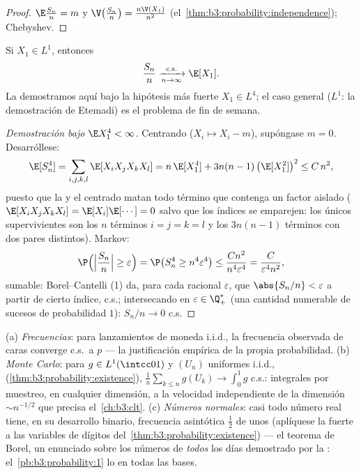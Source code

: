 \begin{proof}
$\E\frac{S_n}n = m$ y $\V\bigl(\frac{S_n}n\bigr) =
\frac{n\V(X_1)}{n^2}$ (el~\cref{thm:b3:probability:independence});
Chebyshev.
\end{proof}

\begin{theorem}
\label{thm:b3:probability:slln}
Si $X_1 \in L^1$, entonces
\[
\frac{S_n}{n} \xrightarrow[n\to\infty]{\text{c.s.}} \E[X_1].
\]
La demostramos aquí bajo la hipótesis más fuerte $X_1 \in
L^4$; el caso general ($L^1$: la demostración de Etemadi) es el problema
de fin de semana.
\end{theorem}

\begin{proof}[Demostración bajo $\E X_1^4 < \infty$]
Centrando ($X_i \mapsto X_i - m$), supóngase $m = 0$. Desarróllese:
\[
\E[S_n^4] = \sum_{i,j,k,l}\E[X_iX_jX_kX_l]
= n\,\E[X_1^4] + 3n(n-1)\,\bigl(\E[X_1^2]\bigr)^2 \leq
C\,n^2 ,
\]
puesto que la  y
el centrado matan todo término que contenga un factor aislado
($\E[X_iX_jX_kX_l] =
\E[X_i]\E[\cdots] = 0$ salvo que los índices se emparejen: los únicos
supervivientes son los $n$ términos $i=j=k=l$ y los $3n(n-1)$ términos
con dos pares distintos). Markov:
\[
\P\Bigl(\Bigl|\frac{S_n}n\Bigr| \geq \varepsilon\Bigr)
= \P\bigl(S_n^4 \geq n^4\varepsilon^4\bigr)
\leq \frac{Cn^2}{n^4\varepsilon^4} =
\frac{C}{\varepsilon^4n^2},
\]
sumable: Borel--Cantelli (1) da, para cada racional $\varepsilon$, que
$\abs{S_n/n} < \varepsilon$ a partir de cierto índice, c.s.;
intersecando en $\varepsilon \in \Q_+^*$ (una cantidad numerable de
sucesos de probabilidad $1$): $S_n/n \to 0$ c.s.
\end{proof}

\begin{example}
\label{ex:b3:probability:sllnapps}
(a) \emph{Frecuencias}: para lanzamientos de moneda i.i.d., la
frecuencia observada de caras converge c.s.\ a $p$ --- la justificación
empírica de la propia probabilidad. (b) \emph{Monte Carlo}: para $g \in
L^1(\intcc01)$ y $(U_n)$ uniformes i.i.d.,
(\cref{thm:b3:probability:existence}),
$\frac1n\sum_{k\leq n}g(U_k) \to \int_0^1g$ c.s.: integrales por
muestreo, en cualquier dimensión, a la velocidad
independiente de la dimensión
$\sim n^{-1/2}$ que precisa el~\cref{ch:b3:clt}. (c) \emph{Números
normales}: casi todo número real tiene, en su desarrollo binario,
frecuencia asintótica $\frac12$ de unos (aplíquese la
 fuerte a las variables de dígitos
del~\cref{thm:b3:probability:existence}) --- el teorema de Borel, un
enunciado sobre los números de \emph{todos} los días demostrado por la
: el~\cref{pb:b3:probability:1}
lo  en todas las bases.
\end{example}

